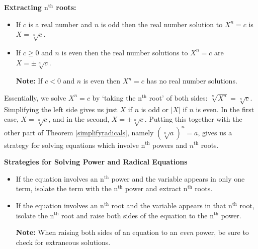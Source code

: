 \documentclass{ximera}
\begin{document}
{\medskip

\colorbox{ResultColor}{\bbm

\centerline{\textbf{Extracting $\text{n}^{\text{th}}$ roots:}}

\begin{itemize}

\item If $c$ is a real number and $n$ is odd then the real number solution to $X^{n} = c$ is $X = \sqrt[n]{c}$.

\item  If $c \geq 0$ and $n$ is even then the real number solutions to $X^{n} = c$ are $X = \pm \sqrt[n]{c}$.

\textbf{Note:} If $c < 0$ and $n$ is even then $X^{n} = c$ has no real number solutions.

\end{itemize}


\medskip

Essentially, we solve $X^{n} = c$ by `taking the $\text{n}^{\text{th}}$ root' of both sides:  $\sqrt[n]{X^{n}} = \sqrt[n]{c}$. Simplifying the left side gives us just $X$ if $n$ is odd or $|X|$ if $n$ is even.  In the first case,  $X =  \sqrt[n]{c}$, and in the second, $X = \pm \sqrt[n]{c}$.  Putting this together with the other part of Theorem \ref{simplifyradicals}, namely $(\sqrt[n]{a})^n = a$, gives us a strategy for solving equations which involve $\text{n}^{\text{th}}$ powers and $n^{\text{th}}$ roots. 

\label{solvepowerandradicaleqns}

\medskip

\colorbox{ResultColor}{\bbm
\centerline{\textbf{Strategies for Solving Power and Radical Equations}}

\begin{itemize}

\item  If the equation involves an $\text{n}^{\text{th}}$ power and the variable appears in only one term, isolate the term with the $\text{n}^{\text{th}}$ power and extract $\text{n}^{\text{th}}$ roots.

\item  If the equation involves an $\text{n}^{\text{th}}$ root and the variable appears in that $\text{n}^{\text{th}}$ root, isolate the $\text{n}^{\text{th}}$ root and raise both sides of the equation to the $\text{n}^{\text{th}}$ power.

\textbf{Note:}  When raising both sides of an equation to an \textit{even} power, be sure to check for extraneous solutions.


\end{itemize}}}}
\end{document}
